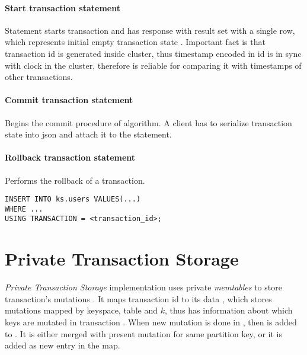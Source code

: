 \paragraph{Start transaction statement} 
Statement starts transaction and has response with result set with a single row, which represents initial empty transaction state . 
 Important fact is that transaction id is generated inside cluster, thus timestamp encoded in id is in sync with clock in the cluster, therefore is reliable for comparing it with timestamps of other transactions.

\paragraph{Commit transaction statement} 
Begins the commit procedure of \mpt algorithm. A client has to serialize transaction state \txState into json and attach it to the statement.


\paragraph{Rollback transaction statement} 
Performs the rollback of a transaction. 


\begin{lstlisting}[style=outcode,label={lst:insertUsingTx},caption={Insert statement with using transactional clause}]
INSERT INTO ks.users VALUES(...) 
WHERE ...
USING TRANSACTION = <transaction_id>;
\end{lstlisting}


\section{Private Transaction Storage}
\emph{Private Transaction Storage} implementation uses private \emph{memtables} to store transaction's mutations \mutations. It maps transaction id to its data , which stores mutations mapped by keyspace, table and $k$, thus \txStorage has information about which keys are mutated in transaction \transaction. 
When new mutation  is done in \transaction, then  is added to . 
It is either merged with present mutation for same partition key, or it is added as new entry in the map.


